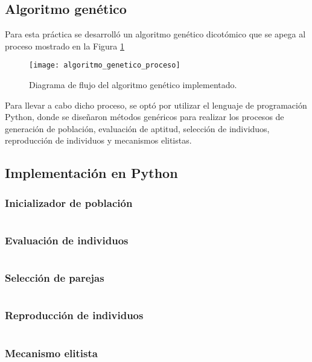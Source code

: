 \subsection{Algoritmo genético}
Para esta práctica se desarrolló un algoritmo genético dicotómico que se apega al proceso mostrado en la Figura \ref{fig: AlgGenetico}

\begin{figure}[htbp]
	\centering
	\texttt{[image: algoritmo\_genetico\_proceso]}
	\caption{Diagrama de flujo del algoritmo genético implementado.}
	\label{fig: AlgGenetico}
\end{figure}

Para llevar a cabo dicho proceso, se optó por utilizar el lenguaje de programación Python, donde se diseñaron métodos genéricos para realizar los procesos de generación de población, evaluación de aptitud, selección de individuos, reproducción de individuos y mecanismos elitistas.

\subsection{Implementación en Python}
\subsubsection{Inicializador de población}
\inputminted[linenos=true, fontsize=\scriptsize]{Python}{../../utils/population.py}

\subsubsection{Evaluación de individuos}
\inputminted[linenos=true, fontsize=\scriptsize]{Python}{../../utils/aptitude.py}

\subsubsection{Selección de parejas}
\inputminted[linenos=true, fontsize=\scriptsize]{Python}{../../utils/selection.py}

\subsubsection{Reproducción de individuos}
\inputminted[linenos=true, fontsize=\scriptsize]{Python}{../../utils/crossover.py}

\subsubsection{Mecanismo elitista}
\inputminted[linenos=true, fontsize=\scriptsize]{Python}{../../utils/elitist.py}

